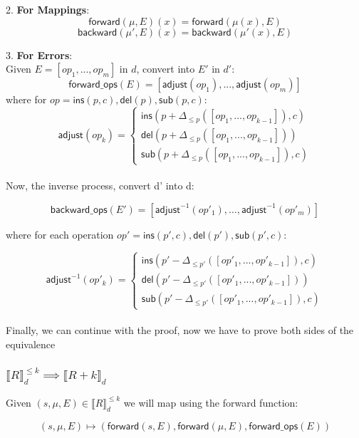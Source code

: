 \documentclass{article}
\begin{document}
2. \textbf{For Mappings}:
\[
\mathsf{forward}(\mu, E)(x) = \mathsf{forward}(\mu(x), E)
\]
\[
\mathsf{backward}(\mu', E)(x) = \mathsf{backward}(\mu'(x), E)
\]

3. \textbf{For Errors}:\\
Given $E = [op_1,...,op_m]$ in $d$, convert into $E'$ in $d'$:
\[
\mathsf{forward\_ops}(E) = [\mathsf{adjust}(op_1),...,\mathsf{adjust}(op_m)]
\]
where for $op = \mathsf{ins}(p,c), \mathsf{del}(p), \mathsf{sub}(p,c)$:
\[
\mathsf{adjust}(op_k) = 
\begin{cases}
\mathsf{ins}(p + \Delta_{\leq p}([op_1, ..., op_{k-1}]), c) \\
\mathsf{del}(p + \Delta_{\leq p}([op_1, ..., op_{k-1}])) \\
\mathsf{sub}(p + \Delta_{\leq p}([op_1, ..., op_{k-1}]), c)
\end{cases}
\]\\

Now, the inverse process, convert d' into d:

\[
\mathsf{backward\_ops}(E') = [\mathsf{adjust}^{-1}(op'_1), \dots, \mathsf{adjust}^{-1}(op'_m)]
\]

where for each operation $op' =  \mathsf{ins}(p', c), \mathsf{del}(p'), \mathsf{sub}(p', c)$:

\[
\mathsf{adjust}^{-1}(op'_k) = 
\begin{cases}
\mathsf{ins}(p' - \Delta_{\leq p'}([op'_1, ..., op'_{k-1}]), c) \\
\mathsf{del}(p' - \Delta_{\leq p'}([op'_1, ..., op'_{k-1}])) \\
\mathsf{sub}(p' - \Delta_{\leq p'}([op'_1, ..., op'_{k-1}]), c)
\end{cases}
\]\\


Finally, we can continue with the proof, now we have to prove both sides of the equivalence

\subsubsection{$\llbracket R \rrbracket^{\leq k}_d \implies \llbracket R + k \rrbracket_d$}
Given $(s, \mu, E) \in \llbracket R \rrbracket^{\leq k}_d$ we will map using the forward function:

\[(s, \mu, E) \mapsto (\mathsf{forward}(s,E), \mathsf{forward}(\mu, E), \mathsf{forward\_ops}(E))\]
\end{document}
